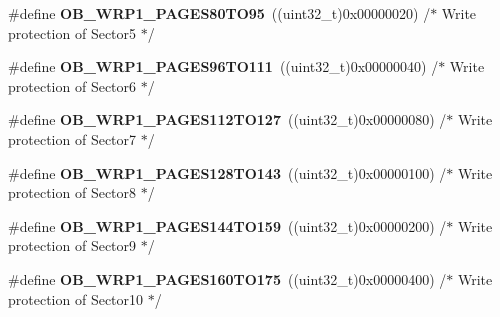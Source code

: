 \begin{DoxyCompactItemize}
\item 
\hypertarget{group___f_l_a_s_h_ex___option___bytes___write___protection1_ga085a4a14d23dadd69a61b07a434fab48}{\#define {\bfseries O\-B\-\_\-\-W\-R\-P1\-\_\-\-P\-A\-G\-E\-S80\-T\-O95}~((uint32\-\_\-t)0x00000020) /$\ast$ Write protection of Sector5 $\ast$/}\label{group___f_l_a_s_h_ex___option___bytes___write___protection1_ga085a4a14d23dadd69a61b07a434fab48}

\item 
\hypertarget{group___f_l_a_s_h_ex___option___bytes___write___protection1_gafc8af571733fa11eefcfb283f266fa88}{\#define {\bfseries O\-B\-\_\-\-W\-R\-P1\-\_\-\-P\-A\-G\-E\-S96\-T\-O111}~((uint32\-\_\-t)0x00000040) /$\ast$ Write protection of Sector6 $\ast$/}\label{group___f_l_a_s_h_ex___option___bytes___write___protection1_gafc8af571733fa11eefcfb283f266fa88}

\item 
\hypertarget{group___f_l_a_s_h_ex___option___bytes___write___protection1_ga34415214e1370429b794a3f901245f8a}{\#define {\bfseries O\-B\-\_\-\-W\-R\-P1\-\_\-\-P\-A\-G\-E\-S112\-T\-O127}~((uint32\-\_\-t)0x00000080) /$\ast$ Write protection of Sector7 $\ast$/}\label{group___f_l_a_s_h_ex___option___bytes___write___protection1_ga34415214e1370429b794a3f901245f8a}

\item 
\hypertarget{group___f_l_a_s_h_ex___option___bytes___write___protection1_gabc93a13ac0e32815e1af1a9dfc915492}{\#define {\bfseries O\-B\-\_\-\-W\-R\-P1\-\_\-\-P\-A\-G\-E\-S128\-T\-O143}~((uint32\-\_\-t)0x00000100) /$\ast$ Write protection of Sector8 $\ast$/}\label{group___f_l_a_s_h_ex___option___bytes___write___protection1_gabc93a13ac0e32815e1af1a9dfc915492}

\item 
\hypertarget{group___f_l_a_s_h_ex___option___bytes___write___protection1_ga10ef307e94042ec09d6fbc4f72f15300}{\#define {\bfseries O\-B\-\_\-\-W\-R\-P1\-\_\-\-P\-A\-G\-E\-S144\-T\-O159}~((uint32\-\_\-t)0x00000200) /$\ast$ Write protection of Sector9 $\ast$/}\label{group___f_l_a_s_h_ex___option___bytes___write___protection1_ga10ef307e94042ec09d6fbc4f72f15300}

\item 
\hypertarget{group___f_l_a_s_h_ex___option___bytes___write___protection1_gaa66f520d8b8032ba3ab69f15f1402484}{\#define {\bfseries O\-B\-\_\-\-W\-R\-P1\-\_\-\-P\-A\-G\-E\-S160\-T\-O175}~((uint32\-\_\-t)0x00000400) /$\ast$ Write protection of Sector10 $\ast$/}\label{group___f_l_a_s_h_ex___option___bytes___write___protection1_gaa66f520d8b8032ba3ab69f15f1402484}


\end{DoxyCompactItemize}
